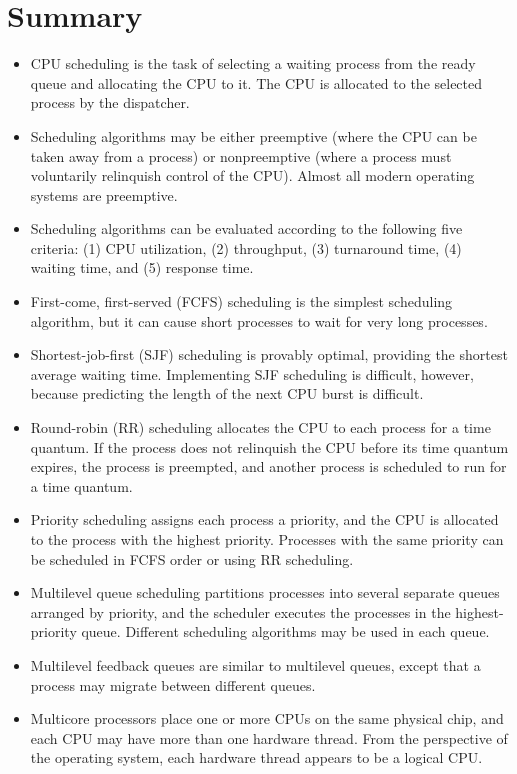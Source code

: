 \section{Summary}\label{sec:5.9}

\begin{itemize}
    \item CPU scheduling is the task of selecting a waiting process from the ready queue and allocating the CPU to it. The CPU is allocated to the selected process by the dispatcher.
    \item Scheduling algorithms may be either preemptive (where the CPU can be taken away from a process) or nonpreemptive (where a process must voluntarily relinquish control of the CPU). Almost all modern operating systems are preemptive.
    \item Scheduling algorithms can be evaluated according to the following five criteria: (1) CPU utilization, (2) throughput, (3) turnaround time, (4) waiting time, and (5) response time.
    \item First-come, first-served (FCFS) scheduling is the simplest scheduling algorithm, but it can cause short processes to wait for very long processes.
    \item Shortest-job-first (SJF) scheduling is provably optimal, providing the shortest average waiting time. Implementing SJF scheduling is difficult, however, because predicting the length of the next CPU burst is difficult.
    \item Round-robin (RR) scheduling allocates the CPU to each process for a time quantum. If the process does not relinquish the CPU before its time quantum expires, the process is preempted, and another process is scheduled to run for a time quantum.
    \item Priority scheduling assigns each process a priority, and the CPU is allocated to the process with the highest priority. Processes with the same priority can be scheduled in FCFS order or using RR scheduling.
    \item Multilevel queue scheduling partitions processes into several separate queues arranged by priority, and the scheduler executes the processes in the highest-priority queue. Different scheduling algorithms may be used in each queue.
    \item Multilevel feedback queues are similar to multilevel queues, except that a process may migrate between different queues.
    \item Multicore processors place one or more CPUs on the same physical chip, and each CPU may have more than one hardware thread. From the perspective of the operating system, each hardware thread appears to be a logical CPU.

\end{itemize}
